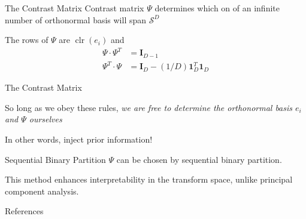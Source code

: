 \documentclass[dark]{cgem-presentation}
\DeclareMathOperator{\clr}{\operatorname{clr}}
\begin{document}
\begin{frame}{The Contrast Matrix}
	\LARGE
	Contrast matrix $\Psi$ determines which on of
	an infinite number of orthonormal basis will span 
	$\mathcal{S}^D$

	\vspace{5mm}
	The rows of $\Psi$ are $\clr(e_i)$ and
	\begin{align*}
		\Psi \cdot \Psi^T &= \mathbf{I}_{D-1} \\
		\Psi^T \cdot \Psi &= \mathbf{I}_D - (1 / D) 
		\mathbf{1}^T_D \mathbf{1}_D
	\end{align*}
\end{frame}

\begin{frame}{The Contrast Matrix}
	\LARGE
	\vspace{1cm}
	\begin{center}
		So long as we obey these rules, \textit{we are free to
		determine the orthonormal basis $e_i$ and $\Psi$ ourselves}

		\vspace{5mm}
		\textcolor{ThirdColor}{
			In other words, inject prior information!
		}
	\end{center}

	\vspace{2.9cm}
	\large
	\begin{flushright}
		\cite{Chave2017}
	\end{flushright}
\end{frame}

\begin{frame}{Sequential Binary Partition}
	\LARGE
	$\Psi$ can be chosen by sequential binary partition.

	\vspace{5mm}
	This method enhances interpretability in the transform
	space, unlike principal component analysis.
\end{frame}

\begin{frame}{References}
	\printbibliography
\end{frame}
\end{document}
